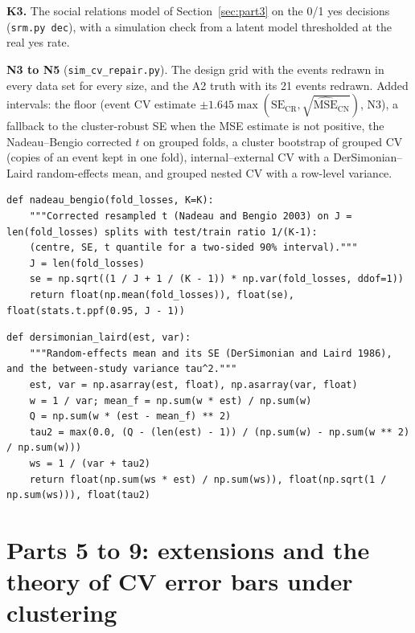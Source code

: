 \documentclass[11pt]{article}
\begin{document}
\textbf{K3.} The social relations model of Section~\ref{sec:part3} on the 0/1 yes decisions (\texttt{srm.py dec}), with a
simulation check from a latent model thresholded at the real yes rate.

\textbf{N3 to N5} (\texttt{sim\_cv\_repair.py}). The design grid with the events redrawn in every data set for every
size, and the A2 truth with its 21 events redrawn. Added intervals: the floor (event CV estimate $\pm 1.645 \max(\text{SE}_{\text{CR}},
\sqrt{\widehat{\text{MSE}}_{\text{CN}}})$, N3), a fallback to the cluster-robust SE when the MSE estimate is not positive, the
Nadeau--Bengio corrected $t$ on grouped folds, a cluster bootstrap of grouped CV (copies of an event kept in one fold),
internal--external CV with a DerSimonian--Laird random-effects mean, and grouped nested CV with a row-level variance.

\begin{lstlisting}[caption={Nadeau--Bengio corrected resampled t (scripts/sim\_cv\_repair.py)}]
def nadeau_bengio(fold_losses, K=K):
    """Corrected resampled t (Nadeau and Bengio 2003) on J = len(fold_losses) splits with test/train ratio 1/(K-1):
    (centre, SE, t quantile for a two-sided 90% interval)."""
    J = len(fold_losses)
    se = np.sqrt((1 / J + 1 / (K - 1)) * np.var(fold_losses, ddof=1))
    return float(np.mean(fold_losses)), float(se), float(stats.t.ppf(0.95, J - 1))
\end{lstlisting}

\begin{lstlisting}[caption={DerSimonian--Laird random-effects mean (scripts/sim\_cv\_repair.py)}]
def dersimonian_laird(est, var):
    """Random-effects mean and its SE (DerSimonian and Laird 1986), and the between-study variance tau^2."""
    est, var = np.asarray(est, float), np.asarray(var, float)
    w = 1 / var; mean_f = np.sum(w * est) / np.sum(w)
    Q = np.sum(w * (est - mean_f) ** 2)
    tau2 = max(0.0, (Q - (len(est) - 1)) / (np.sum(w) - np.sum(w ** 2) / np.sum(w)))
    ws = 1 / (var + tau2)
    return float(np.sum(ws * est) / np.sum(ws)), float(np.sqrt(1 / np.sum(ws))), float(tau2)
\end{lstlisting}

\section{Parts 5 to 9: extensions and the theory of CV error bars under clustering}\label{sec:part5}
\end{document}
